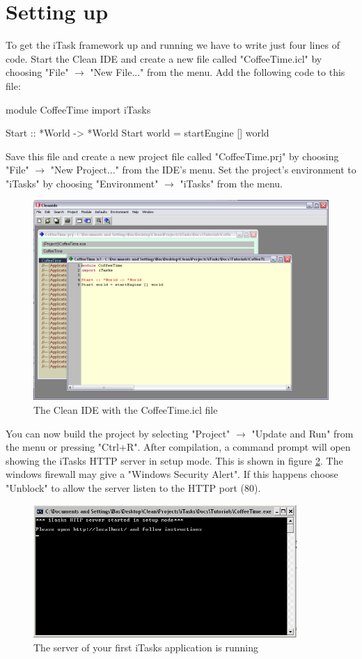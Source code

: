 \documentclass[a4paper,11pt]{article}
\begin{document}
\section{Setting up}
To get the iTask framework up and running we have to write just four lines of code. Start the Clean IDE and create a new file called "CoffeeTime.icl" by choosing  "File" $\rightarrow$ "New File..." from the menu. Add the following code to this file:
\begin{CleanCode}
module CoffeeTime
import iTasks

Start :: *World -> *World
Start world = startEngine [] world
\end{CleanCode}
Save this file and create a new project file called "CoffeeTime.prj" by choosing "File" $\rightarrow$ "New Project..." from the IDE's menu. Set the project's environment to "iTasks" by choosing "Environment" $\rightarrow$ "iTasks" from the menu.
\begin{figure}[h]
\centerline{\includegraphics[width=12cm]{GettingStarted-img/ide-version1.png}}
\caption{The Clean IDE with the CoffeeTime.icl file} \label{ide-version1}
\end{figure}
You can now build the project by selecting "Project" $\rightarrow$ "Update and Run" from the menu or pressing "Ctrl+R". After compilation, a command prompt will open showing the iTasks HTTP server in setup mode. This is shown in figure \ref{setup-server}.  The windows firewall may give a "Windows Security Alert". If this happens choose "Unblock" to allow the server listen to the HTTP port (80).
\begin{figure}[h]
\centerline{\includegraphics[width=10cm]{GettingStarted-img/setup-server.png}}
\caption{The server of your first iTasks application is running} \label{setup-server}
\end{figure}
\end{document}
